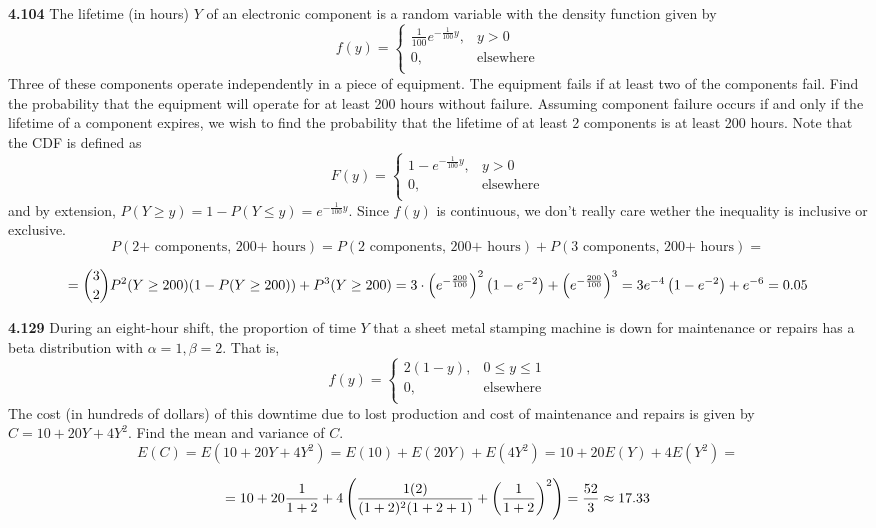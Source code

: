 \documentclass{exam}
\begin{document}
\begin{questions}
\newpage
\textbf{4.104 }
The lifetime (in hours) $Y$ of an electronic component is a random variable with the density function given by
$$f(y) =
\begin{cases}
    \frac{1}{100}e^{-\frac{1}{100}y}, & y > 0 \\
    0, & \text{elsewhere} \\
\end{cases}$$
Three of these components operate independently in a piece of equipment. The equipment fails if at least two of the components fail. Find the probability that the equipment will operate for at least 200 hours without failure.
\sol
Assuming component failure occurs if and only if the lifetime of a component expires, we wish to find the probability that the lifetime of at least 2 components is at least 200 hours. Note that the CDF is defined as
$$F(y) =
\begin{cases}
    1 - e^{-\frac{1}{100}y}, & y > 0 \\
    0, & \text{elsewhere} \\
\end{cases}$$
and by extension, $P(Y \geq y) = 1 - P(Y \leq y) = e^{-\frac{1}{100}y}$. Since $f(y)$ is continuous, we don't really care wether the inequality is inclusive or exclusive.
$$P(\text{2+ components,  200+ hours}) = P(\text{2 components, 200+ hours}) + P(\text{3 components, 200+ hours}) =$$

$$= \binom{3}{2}P^2(Y \geq 200)(1 - P(Y \geq 200)) + P^3(Y \geq 200) = 3 \cdot \left( e^{-\frac{200}{100}} \right)^2\left( 1 - e^{-2} \right) + \left( e^{-\frac{200}{100}} \right)^3 = 3e^{-4}\left( 1 - e^{-2} \right) + e^{-6} = 0.05$$

\newpage
\textbf{4.129 }
During an eight-hour shift, the proportion of time $Y$ that a sheet metal stamping machine is down for maintenance or repairs has a beta distribution with $\alpha = 1, \beta = 2$. That is,
$$f(y) =
\begin{cases}
    2(1 - y), & 0 \leq y \leq 1 \\
    0, & \text{elsewhere} \\
\end{cases}$$
The cost (in hundreds of dollars) of this downtime due to lost production and cost of maintenance and repairs is given by $C = 10 + 20Y + 4Y^2$. Find the mean and variance of $C$.
\sol
$$E(C) = E(10 + 20Y + 4Y^2) = E(10) + E(20Y) + E(4Y^2) = 10 + 20E(Y) + 4E(Y^2) =$$

$$= 10 + 20\frac{1}{1 + 2} + 4\left( \frac{1(2)}{(1 + 2)^2(1 + 2 + 1)} + \left( \frac{1}{1 + 2} \right)^2 \right) = \frac{52}{3} \approx 17.33$$


\end{questions}
\end{document}
